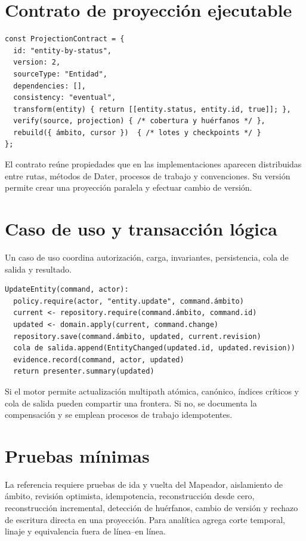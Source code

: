 \section{Contrato de proyección ejecutable}

\begin{verbatim}
const ProjectionContract = {
  id: "entity-by-status",
  version: 2,
  sourceType: "Entidad",
  dependencies: [],
  consistency: "eventual",
  transform(entity) { return [[entity.status, entity.id, true]]; },
  verify(source, projection) { /* cobertura y huérfanos */ },
  rebuild({ ámbito, cursor })  { /* lotes y checkpoints */ }
};
\end{verbatim}

El contrato reúne propiedades que en las implementaciones aparecen distribuidas entre
rutas, métodos de Dater, procesos de trabajo y convenciones. Su versión permite crear una proyección
paralela y efectuar cambio de versión.

\section{Caso de uso y transacción lógica}

Un caso de uso coordina autorización, carga, invariantes, persistencia, cola de salida y resultado.

\begin{verbatim}
UpdateEntity(command, actor):
  policy.require(actor, "entity.update", command.ámbito)
  current <- repository.require(command.ámbito, command.id)
  updated <- domain.apply(current, command.change)
  repository.save(command.ámbito, updated, current.revision)
  cola de salida.append(EntityChanged(updated.id, updated.revision))
  evidence.record(command, actor, updated)
  return presenter.summary(updated)
\end{verbatim}

Si el motor permite actualización multipath atómica, canónico, índices críticos y
cola de salida pueden compartir una frontera. Si no, se documenta la compensación y se emplean
procesos de trabajo idempotentes.

\section{Pruebas mínimas}

La referencia requiere pruebas de ida y vuelta del Mapeador, aislamiento de ámbito,
revisión optimista, idempotencia, reconstrucción desde cero, reconstrucción incremental,
detección de huérfanos, cambio de versión y rechazo de escritura directa en una
proyección. Para analítica agrega corte temporal, linaje y equivalencia fuera de línea--en línea.


